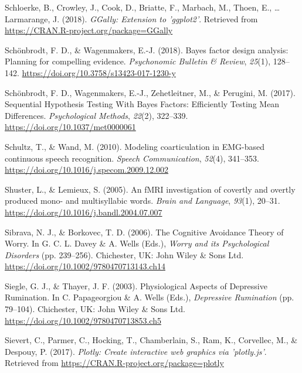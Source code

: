 \documentclass[a4paper,12pt,twoside,openright,oldfontcommands]{memoir}
\begin{document}
\leavevmode\hypertarget{ref-R-GGally}{}%
Schloerke, B., Crowley, J., Cook, D., Briatte, F., Marbach, M., Thoen, E., \ldots{} Larmarange, J. (2018). \emph{GGally: Extension to 'ggplot2'}. Retrieved from \url{https://CRAN.R-project.org/package=GGally}

\leavevmode\hypertarget{ref-schonbrodt_bayes_2018}{}%
Schönbrodt, F. D., \& Wagenmakers, E.-J. (2018). Bayes factor design analysis: Planning for compelling evidence. \emph{Psychonomic Bulletin \& Review}, \emph{25}(1), 128--142. \url{https://doi.org/10.3758/s13423-017-1230-y}

\leavevmode\hypertarget{ref-schonbrodt_sequential_2017}{}%
Schönbrodt, F. D., Wagenmakers, E.-J., Zehetleitner, M., \& Perugini, M. (2017). Sequential Hypothesis Testing With Bayes Factors: Efficiently Testing Mean Differences. \emph{Psychological Methods}, \emph{22}(2), 322--339. \url{https://doi.org/10.1037/met0000061}

\leavevmode\hypertarget{ref-schultz_modeling_2010}{}%
Schultz, T., \& Wand, M. (2010). Modeling coarticulation in EMG-based continuous speech recognition. \emph{Speech Communication}, \emph{52}(4), 341--353. \url{https://doi.org/10.1016/j.specom.2009.12.002}

\leavevmode\hypertarget{ref-shuster_fmri_2005}{}%
Shuster, L., \& Lemieux, S. (2005). An fMRI investigation of covertly and overtly produced mono- and multisyllabic words. \emph{Brain and Language}, \emph{93}(1), 20--31. \url{https://doi.org/10.1016/j.bandl.2004.07.007}

\leavevmode\hypertarget{ref-davey_cognitive_2006}{}%
Sibrava, N. J., \& Borkovec, T. D. (2006). The Cognitive Avoidance Theory of Worry. In G. C. L. Davey \& A. Wells (Eds.), \emph{Worry and its Psychological Disorders} (pp. 239--256). Chichester, UK: John Wiley \& Sons Ltd. \url{https://doi.org/10.1002/9780470713143.ch14}

\leavevmode\hypertarget{ref-papageorgiou_physiological_2003}{}%
Siegle, G. J., \& Thayer, J. F. (2003). Physiological Aspects of Depressive Rumination. In C. Papageorgiou \& A. Wells (Eds.), \emph{Depressive Rumination} (pp. 79--104). Chichester, UK: John Wiley \& Sons Ltd. \url{https://doi.org/10.1002/9780470713853.ch5}

\leavevmode\hypertarget{ref-R-plotly}{}%
Sievert, C., Parmer, C., Hocking, T., Chamberlain, S., Ram, K., Corvellec, M., \& Despouy, P. (2017). \emph{Plotly: Create interactive web graphics via 'plotly.js'}. Retrieved from \url{https://CRAN.R-project.org/package=plotly}
\end{document}
